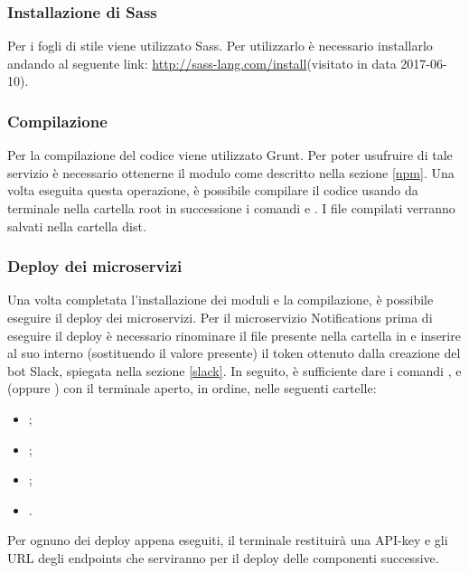 \subsubsection{Installazione di Sass}
Per i fogli di stile viene utilizzato Sass. Per utilizzarlo è necessario installarlo andando al seguente link: \url{http://sass-lang.com/install}(visitato in data 2017-06-10).

\subsubsection{Compilazione}
Per la compilazione del codice viene utilizzato Grunt. Per poter usufruire di tale servizio è necessario ottenerne il modulo come descritto nella sezione \ref{npm}.
Una volta eseguita questa operazione, è possibile compilare il codice usando da terminale nella cartella root in successione i comandi  e . I file compilati verranno salvati nella cartella dist.

\subsubsection{Deploy dei microservizi}\label{deploy-micro}
Una volta completata l'installazione dei moduli e la compilazione, è possibile eseguire il deploy dei microservizi. Per il microservizio Notifications prima di eseguire il deploy è necessario rinominare il file  presente nella cartella  in  e inserire al suo interno (sostituendo il valore presente) il token ottenuto dalla creazione del bot Slack, spiegata nella sezione \ref{slack}.
In seguito, è sufficiente dare i comandi  ,  e  (oppure ) con il terminale aperto, in ordine, nelle seguenti cartelle:
\begin{itemize}
	\item {};
	\item {};
	\item {};
	\item {}.
\end{itemize}
Per ognuno dei deploy appena eseguiti, il terminale restituirà una API-key e gli URL degli endpoints che serviranno per il deploy delle componenti successive.

